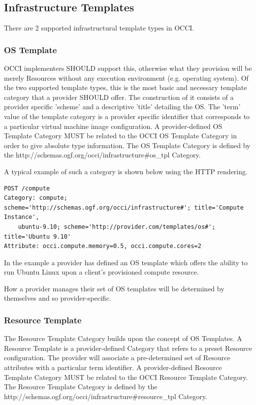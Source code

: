 \documentclass[10pt,a4paper]{article}
\begin{document}
\subsection{Infrastructure Templates}
There are 2 supported infrastructural template types in OCCI.

\subsubsection{OS Template}
OCCI implementers SHOULD support this, otherwise what they provision will be merely Resources without any execution environment (e.g. operating system). Of the two supported template types, this is the most basic and necessary template category that a provider SHOULD offer. The construction of it consists of a provider specific 'scheme' and a descriptive 'title' detailing the OS. The 'term' value of the template category is a provider specific identifier that corresponds to a particular virtual machine image configuration. A provider-defined OS Template Category MUST be related to the OCCI OS Template Category in order to give absolute type information. The OS Template Category is defined by the http://schemas.ogf.org/occi/infrastructure\#os\_tpl Category.

A typical example of such a category is shown below using the HTTP rendering. 

\begin{verbatim}
POST /compute
Category: compute; scheme='http://schemas.ogf.org/occi/infrastructure#'; title='Compute Instance', 
    ubuntu-9.10; scheme='http://provider.com/templates/os#'; title='Ubuntu 9.10'
Attribute: occi.compute.memory=0.5, occi.compute.cores=2
\end{verbatim}
In the example a provider has defined an OS template which offers the ability to run Ubuntu Linux upon a client's provisioned compute resource.

How a provider manages their set of OS templates will be determined by themselves and so provider-specific.

\subsubsection{Resource Template}
The Resource Template Category builds upon the concept of OS Templates. A Resource Template is a provider-defined Category that refers to a preset Resource configuration. The provider will associate a pre-determined set of Resource attributes with a particular term identifier. A provider-defined Resource Template Category MUST be related to the OCCI Resource Template Category. The Resource Template Category is defined by the http://schemas.ogf.org/occi/infrastructure\#resource\_tpl Category.
\end{document}
